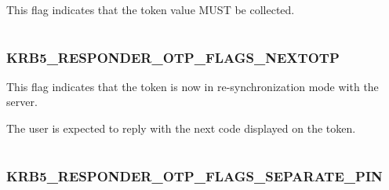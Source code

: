 \documentclass[letterpaper,10pt,english]{sphinxmanual}
\begin{document}
\begin{fulllineitems}
\label{appdev/refs/macros/KRB5_RESPONDER_OTP_FLAGS_COLLECT_TOKEN:KRB5_RESPONDER_OTP_FLAGS_COLLECT_TOKEN}
\end{fulllineitems}


This flag indicates that the token value MUST be collected.

\begin{tabulary}{\linewidth}{|L|L|}
\hline

 & 
\\
\hline\end{tabulary}



\subsubsection{KRB5\_RESPONDER\_OTP\_FLAGS\_NEXTOTP}
\label{appdev/refs/macros/KRB5_RESPONDER_OTP_FLAGS_NEXTOTP:krb5-responder-otp-flags-nextotp-data}\label{appdev/refs/macros/KRB5_RESPONDER_OTP_FLAGS_NEXTOTP::doc}\label{appdev/refs/macros/KRB5_RESPONDER_OTP_FLAGS_NEXTOTP:krb5-responder-otp-flags-nextotp}

\begin{fulllineitems}
\label{appdev/refs/macros/KRB5_RESPONDER_OTP_FLAGS_NEXTOTP:KRB5_RESPONDER_OTP_FLAGS_NEXTOTP}
\end{fulllineitems}


This flag indicates that the token is now in re-synchronization mode with the server.

The user is expected to reply with the next code displayed on the token.

\begin{tabulary}{\linewidth}{|L|L|}
\hline

 & 
\\
\hline\end{tabulary}



\subsubsection{KRB5\_RESPONDER\_OTP\_FLAGS\_SEPARATE\_PIN}
\label{appdev/refs/macros/KRB5_RESPONDER_OTP_FLAGS_SEPARATE_PIN:krb5-responder-otp-flags-separate-pin}\label{appdev/refs/macros/KRB5_RESPONDER_OTP_FLAGS_SEPARATE_PIN:krb5-responder-otp-flags-separate-pin-data}\label{appdev/refs/macros/KRB5_RESPONDER_OTP_FLAGS_SEPARATE_PIN::doc}
\end{document}
